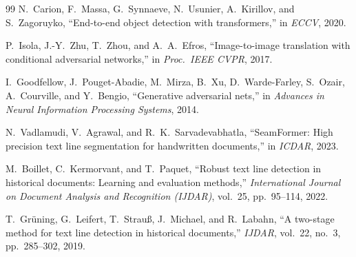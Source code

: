 \documentclass[11pt, a4paper]{article}
\begin{document}
\begin{thebibliography}{99}
N.~Carion, F.~Massa, G.~Synnaeve, N.~Usunier, A.~Kirillov, and S.~Zagoruyko,
``End-to-end object detection with transformers,''
in \textit{ECCV}, 2020.

P.~Isola, J.-Y.~Zhu, T.~Zhou, and A.~A.~Efros,
``Image-to-image translation with conditional adversarial networks,''
in \textit{Proc.\ IEEE CVPR}, 2017.

I.~Goodfellow, J.~Pouget-Abadie, M.~Mirza, B.~Xu, D.~Warde-Farley, S.~Ozair, A.~Courville, and Y.~Bengio,
``Generative adversarial nets,''
in \textit{Advances in Neural Information Processing Systems}, 2014.

N.~Vadlamudi, V.~Agrawal, and R.~K.~Sarvadevabhatla,
``SeamFormer: High precision text line segmentation for handwritten documents,''
in \textit{ICDAR}, 2023.

M.~Boillet, C.~Kermorvant, and T.~Paquet,
``Robust text line detection in historical documents: Learning and evaluation methods,''
\textit{International Journal on Document Analysis and Recognition (IJDAR)}, vol.~25, pp.~95--114, 2022.

T.~Gr\"{u}ning, G.~Leifert, T.~Strau\ss{}, J.~Michael, and R.~Labahn,
``A two-stage method for text line detection in historical documents,''
\textit{IJDAR}, vol.~22, no.~3, pp.~285--302, 2019.

\end{thebibliography}
\end{document}

